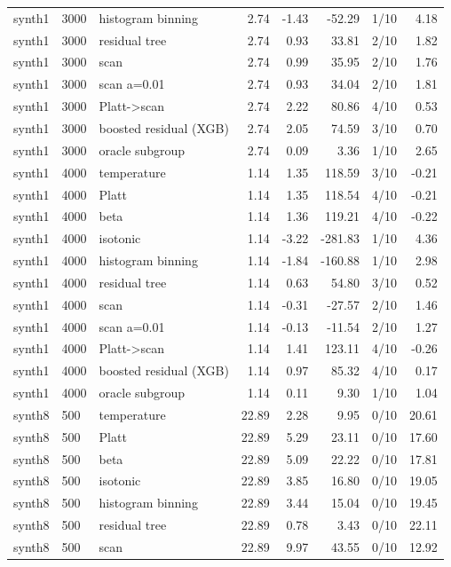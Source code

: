 \begin{tabular}{lllrrrlr}
synth1 & 3000 & histogram binning & 2.74 & -1.43 & -52.29 & 1/10 & 4.18 \\
synth1 & 3000 & residual tree & 2.74 & 0.93 & 33.81 & 2/10 & 1.82 \\
synth1 & 3000 & scan & 2.74 & 0.99 & 35.95 & 2/10 & 1.76 \\
synth1 & 3000 & scan a=0.01 & 2.74 & 0.93 & 34.04 & 2/10 & 1.81 \\
synth1 & 3000 & Platt->scan & 2.74 & 2.22 & 80.86 & 4/10 & 0.53 \\
synth1 & 3000 & boosted residual (XGB) & 2.74 & 2.05 & 74.59 & 3/10 & 0.70 \\
synth1 & 3000 & oracle subgroup & 2.74 & 0.09 & 3.36 & 1/10 & 2.65 \\
synth1 & 4000 & temperature & 1.14 & 1.35 & 118.59 & 3/10 & -0.21 \\
synth1 & 4000 & Platt & 1.14 & 1.35 & 118.54 & 4/10 & -0.21 \\
synth1 & 4000 & beta & 1.14 & 1.36 & 119.21 & 4/10 & -0.22 \\
synth1 & 4000 & isotonic & 1.14 & -3.22 & -281.83 & 1/10 & 4.36 \\
synth1 & 4000 & histogram binning & 1.14 & -1.84 & -160.88 & 1/10 & 2.98 \\
synth1 & 4000 & residual tree & 1.14 & 0.63 & 54.80 & 3/10 & 0.52 \\
synth1 & 4000 & scan & 1.14 & -0.31 & -27.57 & 2/10 & 1.46 \\
synth1 & 4000 & scan a=0.01 & 1.14 & -0.13 & -11.54 & 2/10 & 1.27 \\
synth1 & 4000 & Platt->scan & 1.14 & 1.41 & 123.11 & 4/10 & -0.26 \\
synth1 & 4000 & boosted residual (XGB) & 1.14 & 0.97 & 85.32 & 4/10 & 0.17 \\
synth1 & 4000 & oracle subgroup & 1.14 & 0.11 & 9.30 & 1/10 & 1.04 \\
synth8 & 500 & temperature & 22.89 & 2.28 & 9.95 & 0/10 & 20.61 \\
synth8 & 500 & Platt & 22.89 & 5.29 & 23.11 & 0/10 & 17.60 \\
synth8 & 500 & beta & 22.89 & 5.09 & 22.22 & 0/10 & 17.81 \\
synth8 & 500 & isotonic & 22.89 & 3.85 & 16.80 & 0/10 & 19.05 \\
synth8 & 500 & histogram binning & 22.89 & 3.44 & 15.04 & 0/10 & 19.45 \\
synth8 & 500 & residual tree & 22.89 & 0.78 & 3.43 & 0/10 & 22.11 \\
synth8 & 500 & scan & 22.89 & 9.97 & 43.55 & 0/10 & 12.92 \\

\end{tabular}
